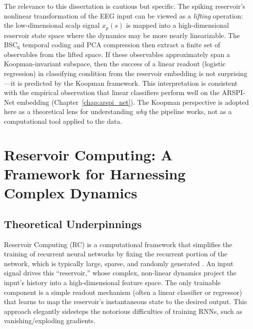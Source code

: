 The relevance to this dissertation is cautious but specific. The spiking reservoir's nonlinear transformation of the EEG input can be viewed as a \emph{lifting} operation: the low-dimensional scalp signal $x_p(s)$ is mapped into a high-dimensional reservoir state space where the dynamics may be more nearly linearizable. The BSC$_6$ temporal coding and PCA compression then extract a finite set of observables from the lifted space. If these observables approximately span a Koopman-invariant subspace, then the success of a linear readout (logistic regression) in classifying condition from the reservoir embedding is not surprising---it is predicted by the Koopman framework. This interpretation is consistent with the empirical observation that linear classifiers perform well on the ARSPI-Net embedding (Chapter~\ref{chap:arspi_net}). The Koopman perspective is adopted here as a theoretical lens for understanding \emph{why} the pipeline works, not as a computational tool applied to the data.


\section{Reservoir Computing: A Framework for Harnessing Complex Dynamics}
\label{sec:reservoir_computing}

\subsection{Theoretical Underpinnings}
\label{sec:rc_theory}
Reservoir Computing (RC) is a computational framework that simplifies the training of recurrent neural networks by fixing the recurrent portion of the network, which is typically large, sparse, and randomly generated \cite{jaeger2001echo}. An input signal drives this ``reservoir,'' whose complex, non-linear dynamics project the input's history into a high-dimensional feature space. The only trainable component is a simple readout mechanism (often a linear classifier or regressor) that learns to map the reservoir's instantaneous state to the desired output. This approach elegantly sidesteps the notorious difficulties of training RNNs, such as vanishing/exploding gradients.


